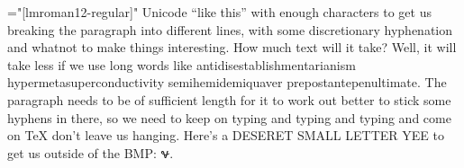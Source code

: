 \font\x="[lmroman12-regular]"
\x Unicode “like this” with enough characters to get us breaking the paragraph
into different lines, with some discretionary hyphenation and whatnot to make
things interesting. How much text will it take? Well, it will take less if we
use long words like antidisestablishmentarianism hypermetasuperconductivity
semihemidemiquaver prepostantepenultimate. The paragraph needs to be of
sufficient length for it to work out better to stick some hyphens in there, so
we need to keep on typing and typing and typing and come on TeX don't leave us
hanging. Here's a DESERET SMALL LETTER YEE to get us outside of the BMP: 𐐷.
\bye
